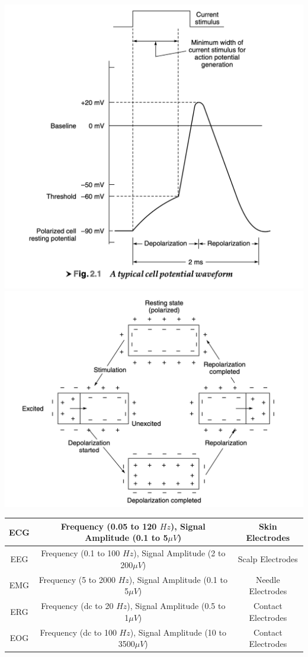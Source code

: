 \documentclass{article}
\begin{document}
\begin{center}
    \includegraphics[scale=0.4]{Screenshot 2023-04-30 at 3.13.04 PM.png} 
    \\
    \includegraphics[scale=0.4]{Screenshot 2023-04-30 at 3.21.17 PM.png}
\end{center}
\begin{center}
    \begin{tabular}{|c|c|c|}
    \hline
        ECG & Frequency (0.05 to 120 $Hz$), Signal Amplitude (0.1 to 5$\mu V$) & Skin Electrodes  \\
        \hline
        EEG & Frequency (0.1 to 100 $Hz$), Signal Amplitude (2 to 200$\mu V$) & Scalp Electrodes \\
        \hline
        EMG & Frequency (5 to 2000 $Hz$), Signal Amplitude (0.1 to 5$\mu V$) & Needle Electrodes \\
        \hline
        ERG & Frequency (dc to 20 $Hz$), Signal Amplitude (0.5 to 1$\mu V$) & Contact Electrodes \\
        \hline
        EOG & Frequency (dc to 100 $Hz$), Signal Amplitude (10 to 3500$\mu V$) & Contact Electrodes \\
        \hline
    \end{tabular}
\end{center}\newpage
\end{document}
